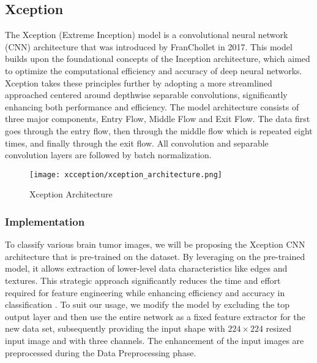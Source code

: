\subsection{Xception}\label{xception}


The Xception (Extreme Inception) model is a convolutional neural network (CNN) architecture that was introduced by Fran Chollet in 2017. This model builds upon the foundational concepts of the Inception architecture, which aimed to optimize the computational efficiency and accuracy of deep neural networks. Xception takes these principles further by adopting a more streamlined approached centered around depthwise separable convolutions, significantly enhancing both performance and efficiency. The model architecture consists of three major components, Entry Flow, Middle Flow and Exit Flow. The data first goes through the entry flow, then through the middle flow which is repeated eight times, and finally through the exit flow. All convolution and separable convolution layers are followed by batch normalization. %

\begin{figure}[H]
  \begin{center}
    \texttt{[image: xcception/xception\_architecture.png]}
  \end{center}
  \caption{Xception Architecture}\label{f:xception_architecture}
\end{figure}


\subsubsection{Implementation}

To classify various brain tumor images, we will be proposing the Xception CNN architecture that is pre-trained on the \cite{ImageNet} dataset. By leveraging on the pre-trained model, it allows extraction of lower-level data characteristics like edges and textures. This strategic approach significantly reduces the time and effort required for feature engineering while enhancing efficiency and accuracy in classification \cite{Pre-trainedModel}. To suit our usage, we modify the model by excluding the top output layer and then use the entire network as a fixed feature extractor for the new data set, subsequently providing the input shape with $224\times224$ resized input image and with three channels. The enhancement of the input images are preprocessed during the Data Preprocessing phase.

